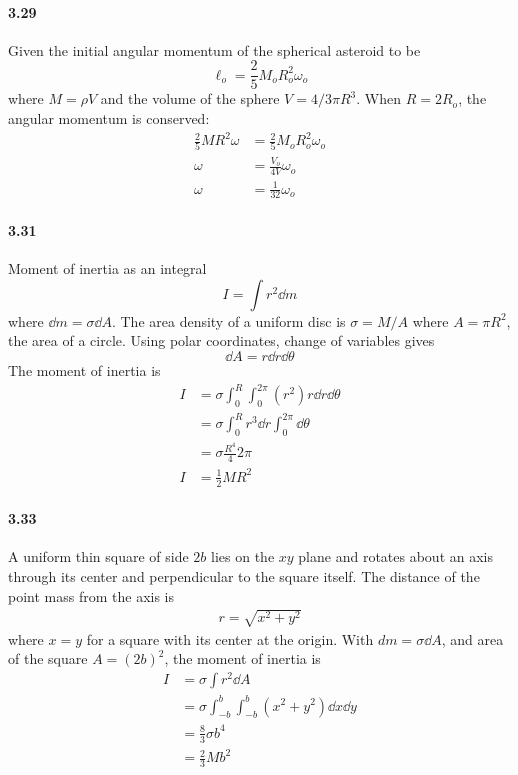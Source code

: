 \documentclass[../problems.tex]{subfiles}
\begin{document}
\paragraph{3.29}
Given the initial angular momentum of the spherical asteroid to be
\begin{equation*}
    \ell_o = \frac{2}{5} M_o R_o^2 \omega_o
\end{equation*}
where $M = \rho V$ and the volume of the sphere $V = 4/3 \pi R^3$. When $R = 2R_o$, the angular
momentum is conserved:
\begin{align*}
    \frac{2}{5} M R^2 \omega &= \frac{2}{5} M_o R_o^2 \omega_o \\
    \omega &= \frac{V_o}{4V} \omega_o \\
    \omega &= \frac{1}{32} \omega_o
\end{align*}

\paragraph{3.31}
Moment of inertia as an integral
\begin{equation*}
    I = \int r^2 \dd{m}
\end{equation*}
where $\dd{m} = \sigma \dd{A}$. The area density of a uniform disc is $\sigma = M / A$ where
$A = \pi R^2$, the area of a circle. Using polar coordinates, change of variables gives
\begin{equation*}
    \dd{A} = r \dd{r} \dd{\theta}
\end{equation*}
The moment of inertia is
\begin{align*}
    I &= \sigma \int_0^R \int_0^{2\pi} (r^2) r \dd{r} \dd{\theta} \\
    &= \sigma \int_0^R r^3 \dd{r} \int_0^{2\pi} \dd{\theta} \\
    &= \sigma \frac{R^4}{4} 2\pi \\
    I &= \frac{1}{2} M R^2
\end{align*}

\paragraph{3.33}
A uniform thin square of side $2b$ lies on the $xy$ plane and rotates about an axis through its
center and perpendicular to the square itself. The distance of the point mass from the axis is
\begin{align*}
    r = \sqrt{x^2 + y^2}
\end{align*}
where $x = y$ for a square with its center at the origin. With $dm = \sigma \dd{A}$, and area of the
square $A = (2b)^2$, the moment of inertia is
\begin{align*}
    I &= \sigma \int r^2  \dd{A} \\
    &= \sigma \int_{-b}^{b} \int_{-b}^{b} (x^2 + y^2) \dd{x} \dd{y} \\
    &= \frac{8}{3} \sigma b^4 \\
    &= \frac{2}{3} M b^2
\end{align*}
\end{document}

